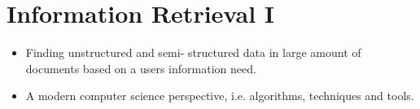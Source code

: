 
\section{Information Retrieval I}

\begin{breakbox}
\begin{itemize}
	\item Finding unstructured and semi- structured data in large amount of documents based on a users information need.
	\item A modern computer science perspective, i.e. algorithms, techniques and tools.
\end{itemize}
\end{breakbox}
